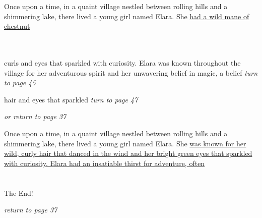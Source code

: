 \documentclass{memoir}
\begin{document}
        


        \hspace{1cm}\vfill
        \begin{minipage}{3in}
        \LARGE
        Once upon a time, in a quaint village nestled between rolling hills and a shimmering lake, there lived a young girl named Elara. She \ul{had a wild mane of chestnut}\\ \vspace{5mm} \\
  \\ 

        \hspace{1cm}\begin{minipage}{6cm}
        \normalsize
            curls and eyes that sparkled with curiosity. Elara was known throughout the village for her adventurous spirit and her unwavering belief in magic, a belief \hfill \textit{turn to page 45}\\ \vspace{5mm}

hair and eyes that sparkled  \hfill \textit{turn to page 47}\\ \vspace{5mm}

\hfill \textit{or return to page 37}
        \end{minipage} 
        \end{minipage}
        \hspace{1cm}\vfill
        \cleardoublepage

        


        \hspace{1cm}\vfill
        \begin{minipage}{3in}
        \LARGE
        Once upon a time, in a quaint village nestled between rolling hills and a shimmering lake, there lived a young girl named Elara. She \ul{was known for her wild, curly hair that danced in the wind and her bright green eyes that sparkled with curiosity. Elara had an insatiable thirst for adventure, often}\\ \vspace{5mm} \\
 \\\vspace{1cm} The End! \\ 

        \hspace{1cm}\begin{minipage}{6cm}
        \normalsize
            \hfill \textit{return to page 37}
        \end{minipage} 
        \end{minipage}
        \hspace{1cm}\vfill
        \cleardoublepage
\end{document}
